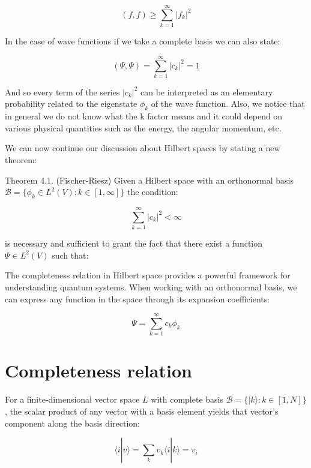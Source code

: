 \begin{equation}
(f, f) \geq \sum_{k=1}^{\infty}|f_k|^2
\end{equation}

In the case of wave functions if we take a complete basis we can also state:

\begin{equation}
(\Psi, \Psi) = \sum_{k=1}^{\infty}|c_k|^2 = 1
\end{equation}

And so every term of the series $|c_k|^2$ can be interpreted as an elementary probability related to the eigenstate $\phi_k$ of the wave function. Also, we notice that in general we do not know what the k factor means and it could depend on various physical quantities such as the energy, the angular momentum, etc.

We can now continue our discussion about Hilbert spaces by stating a new theorem:

Theorem 4.1. (Fischer-Riesz) Given a Hilbert space with an orthonormal basis $\mathcal{B} = \{\phi_k \in L^2(V): k \in [1,\infty]\}$ the condition:

\begin{equation}
\sum_{k=1}^{\infty}|c_k|^2 < \infty
\end{equation}

is necessary and sufficient to grant the fact that there exist a function $\Psi \in L^2(V)$ such that:


The completeness relation in Hilbert space provides a powerful framework for understanding quantum systems. When working with an orthonormal basis, we can express any function in the space through its expansion coefficients:

\begin{equation}
\Psi = \sum_{k=1}^{\infty} c_k\phi_k
\end{equation}

\section{Completeness relation}

For a finite-dimensional vector space $L$ with complete basis $\mathcal{B} = \{|k\rangle: k \in [1,N]\}$, the scalar product of any vector with a basis element yields that vector's component along the basis direction:

\begin{equation}
\langle i|v\rangle = \sum_k v_k\langle i|k\rangle = v_i
\end{equation}

